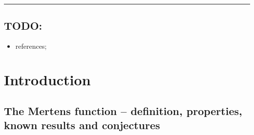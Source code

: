 \documentclass[11pt,reqno,a4letter]{article}
\numberwithin{figure}{section}
\numberwithin{table}{section}
\theoremstyle{plain}
\numberwithin{theorem}{section}
\theoremstyle{definition}
\begin{document}
\bigskip\hrule\bigskip

\subsection*{TODO: } 
\begin{itemize} 
     \item references; 
\end{itemize} 

\newpage
\section{Introduction} 

\subsection{The Mertens function -- definition, properties, known results and conjectures} 
\label{subSection_MertensMxClassical_Intro} 
\end{document}
